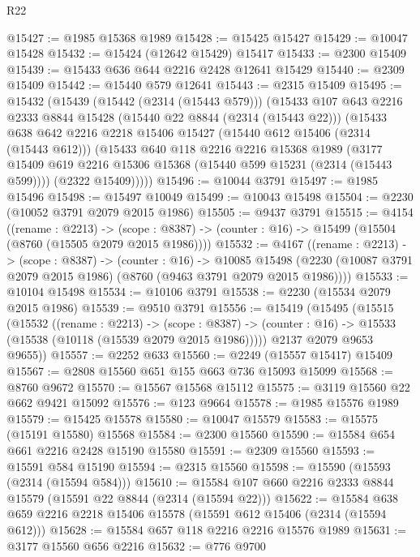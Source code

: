 \begin{lexlean}{R22}
\begin{coremodule}
@15427 := @1985 @15368 @1989
@15428 := @15425 @15427
@15429 := @10047 @15428
@15432 := @15424 (@12642 @15429) @15417
@15433 := @2300 @15409
@15439 := @15433 @636 @644 @2216 @2428 @12641 @15429
@15440 := @2309 @15409
@15442 := @15440 @579 @12641
@15443 := @2315 @15409
@15495 := @15432
    (@15439
      (@15442 (@2314 (@15443 @579)))
      (@15433
        @107
        @643
        @2216
        @2333
        @8844
        @15428
        (@15440 @22 @8844 (@2314 (@15443 @22)))
        (@15433
          @638
          @642
          @2216
          @2218
          @15406
          @15427
          (@15440 @612 @15406 (@2314 (@15443 @612)))
          (@15433
            @640
            @118
            @2216
            @2216
            @15368
            @1989
            (@3177 @15409 @619 @2216 @15306 @15368 (@15440 @599 @15231 (@2314 (@15443 @599))))
            (@2322 @15409)))))
@15496 := @10044 @3791
@15497 := @1985 @15496
@15498 := @15497 @10049
@15499 := @10043 @15498
@15504 := @2230 (@10052 @3791 @2079 @2015 @1986)
@15505 := @9437 @3791
@15515 := @4154
    ((rename : @2213) ->
    (scope : @8387) -> (counter : @16) -> @15499 (@15504 (@8760 (@15505 @2079 @2015 @1986))))
@15532 := @4167
    ((rename : @2213) ->
    (scope : @8387) ->
    (counter : @16) ->
    @10085 @15498 (@2230 (@10087 @3791 @2079 @2015 @1986) (@8760 (@9463 @3791 @2079 @2015 @1986))))
@15533 := @10104 @15498
@15534 := @10106 @3791
@15538 := @2230 (@15534 @2079 @2015 @1986)
@15539 := @9510 @3791
@15556 := @15419
    (@15495
      (@15515
        (@15532
          ((rename : @2213) ->
          (scope : @8387) ->
          (counter : @16) -> @15533 (@15538 (@10118 (@15539 @2079 @2015 @1986)))))
        @2137
        @2079
        @9653
        @9655))
@15557 := @2252 @633
@15560 := @2249 (@15557 @15417) @15409
@15567 := @2808 @15560 @651 @155 @663 @736 @15093 @15099
@15568 := @8760 @9672
@15570 := @15567 @15568 @15112
@15575 := @3119 @15560 @22 @662 @9421 @15092
@15576 := @123 @9664
@15578 := @1985 @15576 @1989
@15579 := @15425 @15578
@15580 := @10047 @15579
@15583 := @15575 (@15191 @15580) @15568
@15584 := @2300 @15560
@15590 := @15584 @654 @661 @2216 @2428 @15190 @15580
@15591 := @2309 @15560
@15593 := @15591 @584 @15190
@15594 := @2315 @15560
@15598 := @15590 (@15593 (@2314 (@15594 @584)))
@15610 := @15584 @107 @660 @2216 @2333 @8844 @15579 (@15591 @22 @8844 (@2314 (@15594 @22)))
@15622 := @15584 @638 @659 @2216 @2218 @15406 @15578 (@15591 @612 @15406 (@2314 (@15594 @612)))
@15628 := @15584 @657 @118 @2216 @2216 @15576 @1989
@15631 := @3177 @15560 @656 @2216
@15632 := @776 @9700

\end{coremodule}
\end{lexlean}
